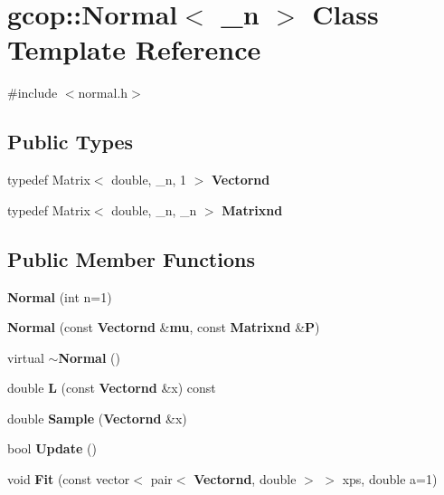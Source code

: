 \section{gcop\-:\-:\-Normal$<$ \-\_\-n $>$ \-Class \-Template \-Reference}
\label{classgcop_1_1Normal}


{\ttfamily \#include $<$normal.\-h$>$}

\subsection*{\-Public \-Types}
\begin{DoxyCompactItemize}
\item 
typedef \-Matrix$<$ double, \-\_\-n, 1 $>$ {\bf \-Vectornd}
\item 
typedef \-Matrix$<$ double, \-\_\-n, \-\_\-n $>$ {\bf \-Matrixnd}
\end{DoxyCompactItemize}
\subsection*{\-Public \-Member \-Functions}
\begin{DoxyCompactItemize}
\item 
{\bf \-Normal} (int n=1)
\item 
{\bf \-Normal} (const {\bf \-Vectornd} \&{\bf mu}, const {\bf \-Matrixnd} \&{\bf \-P})
\item 
virtual {\bf $\sim$\-Normal} ()
\item 
double {\bf \-L} (const {\bf \-Vectornd} \&x) const 
\item 
double {\bf \-Sample} ({\bf \-Vectornd} \&x)
\item 
bool {\bf \-Update} ()
\item 
void {\bf \-Fit} (const vector$<$ pair$<$ {\bf \-Vectornd}, double $>$ $>$ xps, double a=1)
\end{DoxyCompactItemize}
